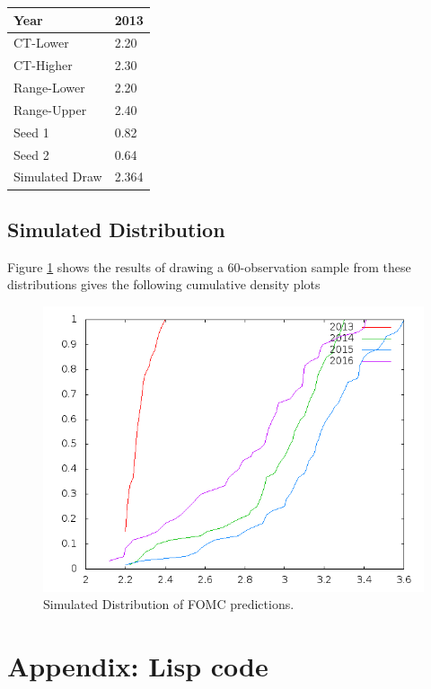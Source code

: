 \documentclass[11pt]{article}
\begin{document}
\begin{tabular}{ll}
Year & 2013\\
\hline
CT-Lower & 2.20 \footnotemark\\
CT-Higher & 2.30 \footnotemark\\
Range-Lower & 2.20 \footnotemark\\
Range-Upper & 2.40 \footnotemark\\
\hline
Seed 1 & 0.82 \footnotemark\\
Seed 2 & 0.64 \footnotemark[13]{}\\
Simulated Draw & 2.364 \footnotemark\\
\end{tabular}

\subsection{Simulated Distribution}
\label{sec-2-1}

Figure \ref{fig:Sim} shows the results of drawing a 60-observation sample from these distributions gives the following cumulative density plots 

\begin{figure}[htb]
\centering
\includegraphics[width=.9\linewidth]{./example2.png}
\caption{\label{fig:Sim}Simulated Distribution of FOMC predictions.}
\end{figure}
\section{Appendix: Lisp code}
\label{sec-3}
\end{document}
